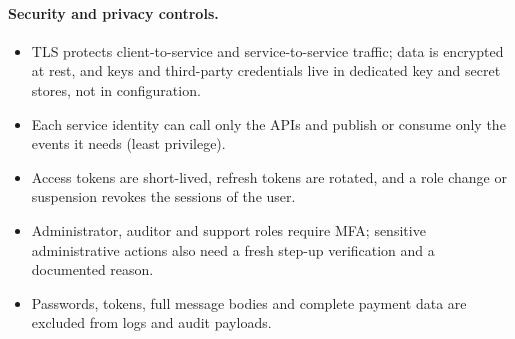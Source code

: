 \paragraph{Security and privacy controls.}
\begin{itemize}
  \item TLS protects client-to-service and service-to-service traffic; data
    is encrypted at rest, and keys and third-party credentials live in
    dedicated key and secret stores, not in configuration.
  \item Each service identity can call only the APIs and publish or consume
    only the events it needs (least privilege).
  \item Access tokens are short-lived, refresh tokens are rotated, and a role
    change or suspension revokes the sessions of the user.
  \item Administrator, auditor and support roles require MFA; sensitive
    administrative actions also need a fresh step-up verification and a
    documented reason.
  \item Passwords, tokens, full message bodies and complete payment data are
    excluded from logs and audit payloads.
\end{itemize}
\endgroup

